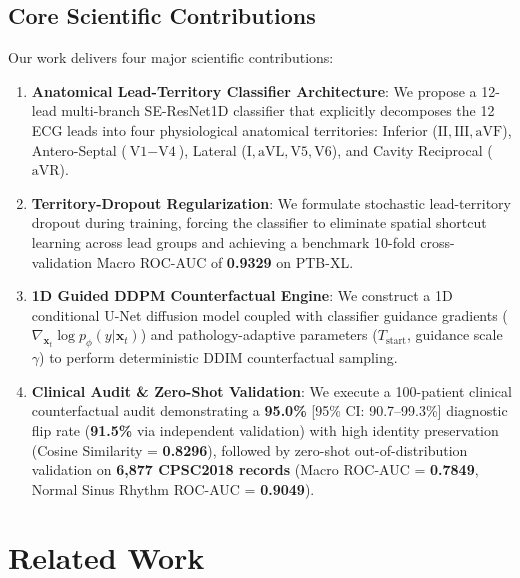 \documentclass[5p,twocolumn,10pt]{elsarticle}
\begin{document}
\subsection{Core Scientific Contributions}
Our work delivers four major scientific contributions:
\begin{enumerate}
    \item \textbf{Anatomical Lead-Territory Classifier Architecture}: We propose a 12-lead multi-branch SE-ResNet1D classifier that explicitly decomposes the 12 ECG leads into four physiological anatomical territories: Inferior ($\text{II}, \text{III}, \text{aVF}$), Antero-Septal ($\text{V1}-\text{V4}$), Lateral ($\text{I}, \text{aVL}, \text{V5}, \text{V6}$), and Cavity Reciprocal ($\text{aVR}$).
    \item \textbf{Territory-Dropout Regularization}: We formulate stochastic lead-territory dropout during training, forcing the classifier to eliminate spatial shortcut learning across lead groups and achieving a benchmark 10-fold cross-validation Macro ROC-AUC of \textbf{0.9329} on PTB-XL.
    \item \textbf{1D Guided DDPM Counterfactual Engine}: We construct a 1D conditional U-Net diffusion model coupled with classifier guidance gradients ($\nabla_{\mathbf{x}_t} \log p_\phi(y|\mathbf{x}_t)$) and pathology-adaptive parameters ($T_{\text{start}}$, guidance scale $\gamma$) to perform deterministic DDIM counterfactual sampling.
    \item \textbf{Clinical Audit \& Zero-Shot Validation}: We execute a 100-patient clinical counterfactual audit demonstrating a \textbf{95.0\%} [95\% CI: 90.7--99.3\%] diagnostic flip rate (\textbf{91.5\%} via independent validation) with high identity preservation (Cosine Similarity = \textbf{0.8296}), followed by zero-shot out-of-distribution validation on \textbf{6,877 CPSC2018 records} (Macro ROC-AUC = \textbf{0.7849}, Normal Sinus Rhythm ROC-AUC = \textbf{0.9049}).
\end{enumerate}

\section{Related Work}
\label{sec:related}
\end{document}
